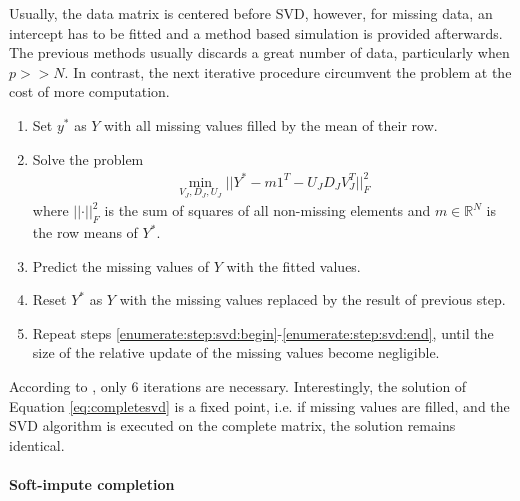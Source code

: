 Usually, the data matrix is centered before SVD, however, for missing data, an
intercept has to be fitted and a method based simulation is provided
afterwards. The previous methods usually discards a great number of data,
particularly when $p >> N$. In contrast, the next iterative procedure
circumvent the problem at the cost of more computation.

\begin{enumerate}[(1)]
\item  Set $y^*$ as $Y$ with all missing values filled by the mean of their
  row.
\item \label{enumerate:step:svd:begin} Solve the problem
  \begin{align} \label{eq:completesvd}
    \min_{V_J, D_J, U_J} \vert \vert Y^* - m 1^T - U_J D_J V_J^T \vert \vert^2_F
  \end{align}
  where $\vert\vert \cdot \vert\vert^2_F$ is the sum of squares of all non-missing
  elements and $m \in \mathbb{R}^N$ is the row means of $Y^*$.
\item Predict the missing values of $Y$ with the fitted values.
\item Reset $Y^*$ as $Y$ with the missing values replaced by the result of
  previous step.
\item \label{enumerate:step:svd:end} Repeat steps
  \ref{enumerate:step:svd:begin}-\ref{enumerate:step:svd:end}, until the size
  of the relative update of the missing values become negligible.
\end{enumerate}

According to \cite{hastie1999imputing}, only 6 iterations are
necessary. Interestingly, the solution of Equation \eqref{eq:completesvd} is a
fixed point, i.e. if missing values are filled, and the SVD algorithm is
executed on the complete matrix, the solution remains identical.


\paragraph{Soft-impute completion}

